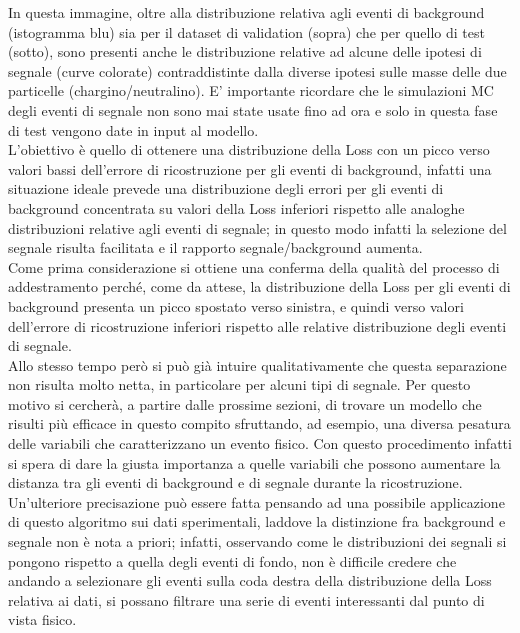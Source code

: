 In questa immagine, oltre alla distribuzione relativa agli eventi di background (istogramma blu) sia per il dataset di validation (sopra) che per quello di test (sotto), sono presenti anche le distribuzione relative ad alcune delle ipotesi di segnale (curve colorate) contraddistinte dalla diverse ipotesi sulle masse delle due particelle (chargino/neutralino). E' importante ricordare che le simulazioni MC degli eventi di segnale non sono mai state usate fino ad ora e solo in questa fase di test vengono date in input al modello. \\
L'obiettivo è quello di ottenere una distribuzione della Loss con un picco verso valori bassi dell'errore di ricostruzione per gli eventi di background, infatti una situazione ideale prevede una distribuzione degli errori per gli eventi di background concentrata su valori della Loss inferiori rispetto alle analoghe distribuzioni relative agli eventi di segnale; in questo modo infatti la selezione del segnale risulta facilitata e il rapporto segnale/background aumenta.\\
Come prima considerazione si ottiene una conferma della qualità del processo di addestramento perché, come da attese, la distribuzione della Loss per gli eventi di background presenta un picco spostato verso sinistra, e quindi verso valori dell'errore di ricostruzione inferiori rispetto alle relative distribuzione degli eventi di segnale. \\ 
Allo stesso tempo però si può già intuire qualitativamente che questa separazione non risulta molto netta, in particolare per alcuni tipi di segnale. Per questo motivo si cercherà, a partire dalle prossime sezioni, di trovare un modello che risulti più efficace in questo compito sfruttando, ad esempio, una diversa pesatura delle variabili che caratterizzano un evento fisico. Con questo procedimento infatti si spera di dare la giusta importanza a quelle variabili che possono aumentare la distanza tra gli eventi di background e di segnale durante la ricostruzione.\\
Un'ulteriore precisazione può essere fatta pensando ad una possibile applicazione di questo algoritmo sui dati sperimentali, laddove la distinzione fra background e segnale non è nota a priori; infatti, osservando come le distribuzioni dei segnali si pongono rispetto a quella degli eventi di fondo, non è difficile credere che andando a selezionare gli eventi sulla coda destra della distribuzione della Loss relativa ai dati, si possano filtrare una serie di eventi interessanti dal punto di vista fisico.

